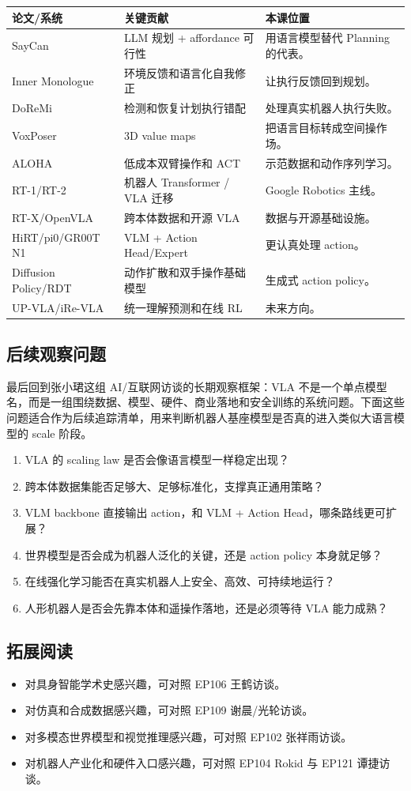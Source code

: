 \documentclass[a4paper]{article}
\begin{document}
\noindent\begin{tabularx}{\textwidth}{p{}p{}X}
\toprule
论文/系统 & 关键贡献 & 本课位置 \\
\midrule
SayCan & LLM 规划 + affordance 可行性 & 用语言模型替代 Planning 的代表。 \\
Inner Monologue & 环境反馈和语言化自我修正 & 让执行反馈回到规划。 \\
DoReMi & 检测和恢复计划执行错配 & 处理真实机器人执行失败。 \\
VoxPoser & 3D value maps & 把语言目标转成空间操作场。 \\
ALOHA & 低成本双臂操作和 ACT & 示范数据和动作序列学习。 \\
RT-1/RT-2 & 机器人 Transformer / VLA 迁移 & Google Robotics 主线。 \\
RT-X/OpenVLA & 跨本体数据和开源 VLA & 数据与开源基础设施。 \\
HiRT/pi0/GR00T N1 & VLM + Action Head/Expert & 更认真处理 action。 \\
Diffusion Policy/RDT & 动作扩散和双手操作基础模型 & 生成式 action policy。 \\
UP-VLA/iRe-VLA & 统一理解预测和在线 RL & 未来方向。 \\
\bottomrule
\end{tabularx}

\subsection{后续观察问题}

最后回到张小珺这组 AI/互联网访谈的长期观察框架：VLA 不是一个单点模型名，而是一组围绕数据、模型、硬件、商业落地和安全训练的系统问题。下面这些问题适合作为后续追踪清单，用来判断机器人基座模型是否真的进入类似大语言模型的 scale 阶段。

\begin{enumerate}
\item VLA 的 scaling law 是否会像语言模型一样稳定出现？
\item 跨本体数据集能否足够大、足够标准化，支撑真正通用策略？
\item VLM backbone 直接输出 action，和 VLM + Action Head，哪条路线更可扩展？
\item 世界模型是否会成为机器人泛化的关键，还是 action policy 本身就足够？
\item 在线强化学习能否在真实机器人上安全、高效、可持续地运行？
\item 人形机器人是否会先靠本体和遥操作落地，还是必须等待 VLA 能力成熟？
\end{enumerate}

\subsection{拓展阅读}

\begin{itemize}
\item 对具身智能学术史感兴趣，可对照 EP106 王鹤访谈。
\item 对仿真和合成数据感兴趣，可对照 EP109 谢晨/光轮访谈。
\item 对多模态世界模型和视觉推理感兴趣，可对照 EP102 张祥雨访谈。
\item 对机器人产业化和硬件入口感兴趣，可对照 EP104 Rokid 与 EP121 谭捷访谈。
\end{itemize}
\end{document}
